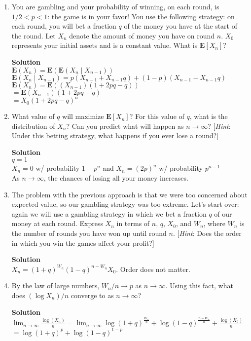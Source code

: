 \documentclass[11pt]{article}
\newenvironment{Parts}{\begin{enumerate}[label=(\alph*)]}{\end{enumerate}}
\newcommand*{\Part}{\item}
\newenvironment{Answer}{\vspace{10pt}\begin{mdframed}\textbf{Solution}\\}{\end{mdframed}\vfill\pagebreak[3]}
\newenvironment{Answer}{\vspace{10pt}}{\vfill\pagebreak[3]}
\newcommand*{\E}{\textbf{E}}
\begin{document}
\begin{Parts}    
  \Part You are gambling and your probability of winning, on each round, is $1/2 < p < 1$: the game is in your favor! You use the following strategy: on each round, you will bet a fraction $q$ of the money you have at the start of the round. Let $X_n$ denote the amount of money you have on round $n$. $X_0$ represents your initial assets and is a constant value. What is $\E[X_n]$?
  \begin{Answer}
$\E(X_n)=\E(\E(X_n \mid X_{n-1}))$\\
$\E(X_n \mid X_{n-1})=p(X_{n-1}+X_{n-1}q)+(1-p)(X_{n-1}-X_{n-1}q)$\\
$\E(X_n)=\E((X_{n-1})(1+2pq-q))$\\
$=\E(X_{n-1})(1+2pq-q)$\\
$=X_0(1+2pq-q)^n$\\
  \end{Answer}
  
  \Part What value of $q$ will maximize $\E[X_n]$? For this value of $q$, what is the distribution of $X_n$? Can you predict what will happen as $n \to \infty$? [\textit{Hint}: Under this betting strategy, what happens if you ever lose a round?]
  \begin{Answer}
$q=1$\\
$X_n=0$ w/ probability $1-p^n$ and $X_n=(2p)^{n}$ w/ probability $p^{n-1}$\\
As $n \rightarrow \infty$, the chances of losing all your money increases. 
  \end{Answer}
  
  \Part The problem with the previous approach is that we were too concerned about expected value, so our gambling strategy was too extreme. Let's start over: again we will use a gambling strategy in which we bet a fraction $q$ of our money at each round. Express $X_n$ in terms of $n$, $q$, $X_0$, and $W_n$, where $W_n$ is the number of rounds you have won up until round $n$. [\textit{Hint}: Does the order in which you win the games affect your profit?]
  \begin{Answer}
$X_n=(1+q)^{W_n}(1-q)^{n-W_n}X_0$. Order does not matter.
  \end{Answer}
  
  \Part By the law of large numbers, $W_n/n \to p$ as $n \to \infty$. Using this fact, what does $(\log X_n)/n$ converge to as $n \to \infty$?
  \begin{Answer}
$\lim_{n \to \infty}\frac{\log(X_n)}{n}=\lim_{n \to \infty}\log(1+q)^{\frac{W_n}{n}}+\log(1-q)^{\frac{n-W_n}{n}}+\frac{\log(X_0)}{n}$\\
$=\log(1+q)^p+\log(1-q)^{1-p}$
  \end{Answer}
  

\end{Parts}
\end{document}
